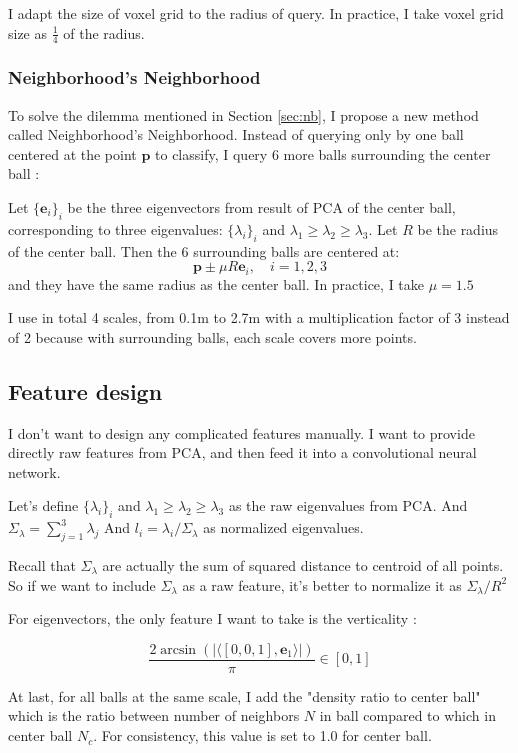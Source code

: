 \documentclass{article}
\begin{document}
I adapt the size of voxel grid to the radius of query. In practice, I take voxel grid size as $\frac{1}{4}$ of the radius.

\subsubsection{Neighborhood's Neighborhood}
To solve the dilemma mentioned in Section \ref{sec:nb}, I propose a new method called Neighborhood's Neighborhood. Instead of querying only by one ball centered at the point $\mathbf{p}$ to classify, I query 6 more balls surrounding the center ball : 

Let $\{\mathbf{e}_i\}_{i}$ be the three eigenvectors from result of PCA of the center ball, corresponding to three eigenvalues: $\{\lambda_i\}_{i}$ and $\lambda_1 \geq \lambda_2 \geq \lambda_3$. Let $R$ be the radius of the center ball. Then the 6 surrounding balls are centered at:
\begin{equation}
\mathbf{p}\pm \mu R \mathbf{e}_i,\quad i=1,2,3
\end{equation}
and they have the same radius as the center ball. In practice, I take $\mu=1.5$

I use in total 4 scales, from 0.1m to 2.7m with a multiplication factor of 3 instead of 2 because with surrounding balls, each scale covers more points.

\subsection{Feature design}
I don't want to design any complicated features manually. I want to provide directly raw features from PCA, and then feed it into a convolutional neural network.

Let's define $\{\lambda_i\}_{i}$ and $\lambda_1 \geq \lambda_2 \geq \lambda_3$ as the raw eigenvalues from PCA. And $\Sigma_\lambda = \sum_{j=1}^{3}\lambda_j$ And $l_i = \lambda_i / \Sigma_\lambda$ as normalized eigenvalues.

Recall that $\Sigma_\lambda$ are actually the sum of squared distance to centroid of all points. So if we want to include $\Sigma_\lambda$ as a raw feature, it's better to normalize it as ${\Sigma_\lambda}/{R^2}$

For eigenvectors, the only feature I want to take is the verticality : 

$$\frac{2\arcsin(|\langle [0,0,1], \mathbf{e}_1\rangle|)}{\pi} \in [0, 1]$$

At last, for all balls at the same scale, I add the "density ratio to center ball" which is the ratio between number of neighbors $N$ in ball compared to which in center ball $N_c$. For consistency, this value is set to 1.0 for center ball.
\end{document}
